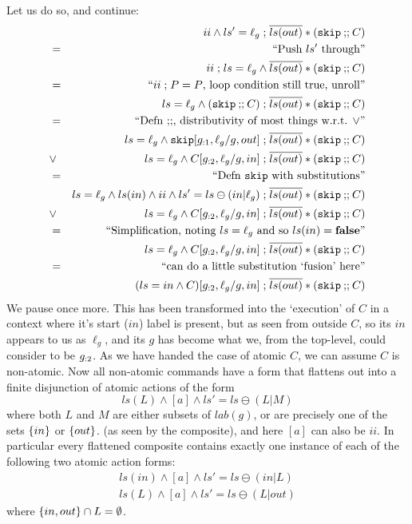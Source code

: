 Let us do so, and continue:
\begin{eqnarray*}
  && ii \land ls'=\ell_g
     \seq \B{ls(out)} * (\cskip \cseq C)
\EQ{Push $ls'$ through}
\\&& ii \seq ls=\ell_g
     \land \B{ls(out)} * (\cskip \cseq C)
\EQ{$ii \seq P=P$, loop condition still true, unroll}
\\&& ls=\ell_g
     \land (\cskip \cseq C) \seq \B{ls(out)} * (\cskip \cseq C)
\EQ{Defn $\cseq$, distributivity of most things w.r.t. $\lor$}
\\&& ls=\ell_g
     \land \cskip[\g{:1},\ell_g/g,out] \seq \B{ls(out)} * (\cskip \cseq C)
\\&\lor&
     ls=\ell_g
     \land C[\g{:2},\ell_g/g,in] \seq \B{ls(out)} * (\cskip \cseq C)
\EQ{Defn  $\cskip$ with substitutions}
\\&& ls=\ell_g
     \land ls(in) \land ii \land ls'=ls \ominus (in|\ell_g) \seq \B{ls(out)} * (\cskip \cseq C)
\\&\lor&
     ls=\ell_g
     \land C[\g{:2},\ell_g/g,in] \seq \B{ls(out)} * (\cskip \cseq C)
\EQ{Simplification, noting $ls=\ell_g$ and so $ls(in) = \false$}
\\&&      ls=\ell_g
     \land C[\g{:2},\ell_g/g,in] \seq \B{ls(out)} * (\cskip \cseq C)
\EQ{can do a little substitution `fusion' here}
\\&&  (ls=in \land C)[\g{:2},\ell_g/g,in] \seq \B{ls(out)} * (\cskip \cseq C)
\end{eqnarray*}
We pause once more.
This has been transformed into the `execution' of $C$
in a context where it's start ($in$) label is present,
but as seen from outside $C$, so its $in$ appears to us as $\ell_g$,
and its $g$ has become what we, from the top-level,
could consider to be $g_{:2}$.
As we have handed the case of atomic $C$,
we can assume $C$ is non-atomic.
Now all non-atomic commands have a form that flattens
out into a finite disjunction of atomic actions
of the form
\[
   ls(L) \land [a] \land ls'=ls\ominus(L|M)
\]
where both $L$ and $M$ are either subsets of $lab(g)$,
or are precisely one of the sets $\{{in}\}$ or $\{{out}\}$.
(as seen by the composite), and here $[a]$ can also be $ii$.
In particular every flattened composite contains
exactly one instance of each of the following two
atomic action forms:
\begin{align*}
   ls(in) \land [a] \land ls'=ls\ominus(in|L)
\\ ls(L) \land [a] \land ls'=ls\ominus(L|out)
\end{align*}
where $\{{in,out}\}\cap L = \emptyset$.
